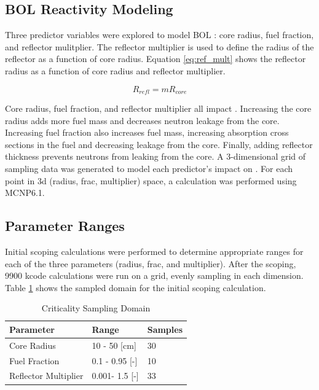 \subsection{BOL Reactivity Modeling}
Three predictor variables were explored to model BOL \keff: core radius,
fuel fraction, and reflector mulitplier. The reflector multiplier is used to
define the radius of the reflector as a function of core radius. Equation
\ref{eq:ref_mult} shows the reflector radius as a function of core radius and
reflector multiplier.

\begin{equation}
    \label{eq:ref_mult}
    R_{refl} = mR_{core}
\end{equation}

Core radius, fuel fraction, and reflector multiplier all impact \keff.
Increasing the core radius adds more fuel mass and decreases neutron leakage 
from the core. Increasing fuel fraction also increases fuel mass, increasing
absorption cross sections in the fuel and decreasing leakage from the core.
Finally, adding reflector thickness prevents neutrons from leaking from the
core. A 3-dimensional grid of sampling data was generated to model each
predictor's impact on \keff. For each
point in 3d (radius, frac, multiplier) space, a \keff calculation was
performed using MCNP6.1.


\subsection{Parameter Ranges}
Initial scoping calculations were performed to determine appropriate ranges for
each of the three parameters (radius, frac, and multiplier). After the scoping,
9900 kcode
calculations were run on a grid, evenly sampling in each dimension.
Table \ref{tab:bol_criticality_1000} shows the sampled domain for the initial
scoping calculation.

\begin{table}[h]
  \centering
  \caption{Criticality Sampling Domain}
  \begin{tabular}{lll}
    \toprule
     Parameter               & Range          & Samples\\ 
    \midrule                                  
     Core Radius             & 10 - 50 [cm]   & 30 \\
     Fuel Fraction 		     & 0.1 - 0.95 [-] & 10 \\
     Reflector Multiplier    & 0.001- 1.5 [-] & 33 \\
  \end{tabular}
  \label{tab:bol_criticality_1000}
\end{table}


